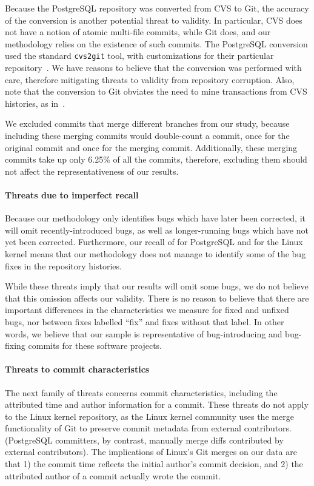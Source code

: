 Because the PostgreSQL repository was converted from CVS to Git, the accuracy of
the conversion is another potential threat to validity.  In particular, CVS does
not have a notion of atomic multi-file commits, while Git does, and our
methodology relies on the existence of such commits. The PostgreSQL conversion
used the standard {\tt cvs2git} tool, with customizations for their particular
repository~\cite{haas09:_so_why_postg_using_git}. We have reasons to believe
that the conversion was performed with care, therefore mitigating threats to
validity from repository corruption.  Also, note that the conversion to Git
obviates the need to mine transactions from CVS histories, as
in~\cite{zimmermann-msr-2004}.

We excluded commits that merge different branches from our study, because
including these merging commits would double-count a commit, once for the
original commit and once for the merging commit.  Additionally, these merging
commits take up only 6.25\% of all the commits, therefore, excluding them should
not affect the representativeness of our results.

\paragraph{Threats due to imperfect recall}

Because our methodology only identifies bugs which have later been corrected, it
will omit recently-introduced bugs, as well as longer-running bugs
which have not yet been corrected. Furthermore, our recall of \postR for
PostgreSQL and \linuxR for the Linux kernel means that our methodology does not
manage to identify some of the bug fixes in the repository histories.

While these threats imply that our results will omit some bugs, we do not
believe that this omission affects our validity. There is no reason to believe
that there are important differences in the characteristics we measure for fixed
and unfixed bugs, nor between fixes labelled ``fix'' and fixes without that
label. In other words, we believe that our sample is representative of
bug-introducing and bug-fixing commits for these software projects.

\paragraph{Threats to commit characteristics}

The next family of threats concerns commit characteristics, including the
attributed time and author information for a commit.  These threats do not apply
to the Linux kernel repository, as the Linux kernel community uses the merge
functionality of Git to preserve commit metadata from external
contributors. (PostgreSQL committers, by contrast, manually merge diffs
contributed by external contributors).  The implications of Linux's Git merges
on our data are that 1) the commit time reflects the initial author's commit
decision, and 2) the attributed author of a commit actually wrote the commit.

